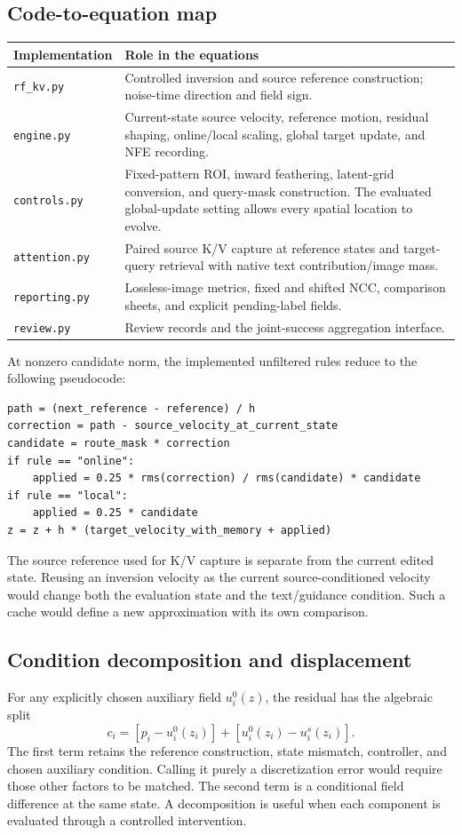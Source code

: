 \documentclass[conference]{IEEEtran}
\begin{document}
\subsection{Code-to-equation map}
\begin{center}\small
\begin{tabular}{p{}p{}}
\toprule
Implementation & Role in the equations\\
\midrule
\texttt{rf\_kv.py} & Controlled inversion and source reference construction; noise-time direction and field sign.\\
\texttt{engine.py} & Current-state source velocity, reference motion, residual shaping, online/local scaling, global target update, and NFE recording.\\
\texttt{controls.py} & Fixed-pattern ROI, inward feathering, latent-grid conversion, and query-mask construction. The evaluated global-update setting allows every spatial location to evolve.\\
\texttt{attention.py} & Paired source K/V capture at reference states and target-query retrieval with native text contribution/image mass.\\
\texttt{reporting.py} & Lossless-image metrics, fixed and shifted NCC, comparison sheets, and explicit pending-label fields.\\
\texttt{review.py} & Review records and the joint-success aggregation interface.\\
\bottomrule
\end{tabular}
\end{center}

At nonzero candidate norm, the implemented unfiltered rules reduce to the following pseudocode:
\begin{verbatim}
path = (next_reference - reference) / h
correction = path - source_velocity_at_current_state
candidate = route_mask * correction
if rule == "online":
    applied = 0.25 * rms(correction) / rms(candidate) * candidate
if rule == "local":
    applied = 0.25 * candidate
z = z + h * (target_velocity_with_memory + applied)
\end{verbatim}
The source reference used for K/V capture is separate from the current edited state. Reusing an inversion velocity as the current source-conditioned velocity would change both the evaluation state and the text/guidance condition. Such a cache would define a new approximation with its own comparison.

\subsection{Condition decomposition and displacement}
For any explicitly chosen auxiliary field $u_i^0(z)$, the residual has the algebraic split
\begin{equation}
c_i=[p_i-u_i^0(z_i)]+[u_i^0(z_i)-u_i^s(z_i)].
\end{equation}
The first term retains the reference construction, state mismatch, controller, and chosen auxiliary condition. Calling it purely a discretization error would require those other factors to be matched. The second term is a conditional field difference at the same state. A decomposition is useful when each component is evaluated through a controlled intervention.
\end{document}
